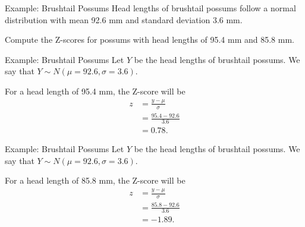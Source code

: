 \begin{frame}{Example: Brushtail Possums}
    Head lengths of brushtail possums follow a normal distribution with mean 92.6 mm and standard deviation 3.6 mm. 
    
    \vspace{12pt}Compute the Z-scores for possums with head lengths of 95.4 mm and 85.8 mm.
\end{frame}

\begin{frame}{Example: Brushtail Possums}
    Let $Y$ be the head lengths of brushtail possums. We say that $Y\sim N(\mu=92.6, \sigma=3.6)$.
    
    \vspace{12pt}For a head length of 95.4 mm, the Z-score will be
    \begin{align*}
        z &= \frac{y-\mu}{\sigma} \\
            &= \frac{95.4-92.6}{3.6} \\
            &= 0.78.
    \end{align*}
\end{frame}

\begin{frame}{Example: Brushtail Possums}
    Let $Y$ be the head lengths of brushtail possums. We say that $Y\sim N(\mu=92.6, \sigma=3.6)$.
    
    \vspace{12pt}For a head length of 85.8 mm, the Z-score will be
    \begin{align*}
        z &= \frac{y-\mu}{\sigma} \\
            &= \frac{85.8-92.6}{3.6} \\
            &= -1.89.
    \end{align*}
\end{frame}

